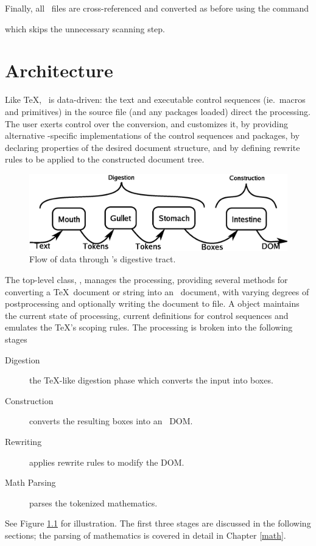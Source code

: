 \documentclass{report}
\begin{document}
Finally, all \XML\ files are cross-referenced and converted as before
using the command
\begin{quote}
\end{quote}
which skips the unnecessary scanning step.

\chapter{Architecture}\label{architecture}
Like \TeX, \LaTeXML\ is data-driven: the text and executable control
sequences (ie.~macros and primitives)
in the source file (and any packages loaded) direct the processing.
The user exerts control over the conversion, and customizes it, by 
providing alternative \LaTeXML-specific implementations of the control sequences and packages,
by declaring properties of the desired document structure,
and by defining rewrite rules to be applied to the constructed document tree.

\begin{figure}[tb]
\includegraphics[width=\columnwidth]{dataflow}
\caption{Flow of data through \LaTeXML's digestive tract.\label{fig:dataflow}}
\end{figure}
The top-level class, \ltxpkg{}, manages the processing, providing several methods
for converting a \TeX\ document or string into an \XML\ document, with varying degrees
of postprocessing and optionally writing the document to file.
A  object maintains the current state
of processing, current definitions for control sequences and emulates the
\TeX's scoping rules.
The processing is broken into the following stages
\begin{description}
 \item[Digestion] the \TeX-like digestion phase which converts the input into boxes.
 \item[Construction] converts the resulting boxes into an \XML\ DOM.
 \item[Rewriting] applies rewrite rules to modify the DOM.
 \item[Math Parsing] parses the tokenized mathematics.
\end{description}
See Figure \ref{fig:dataflow} for illustration.
The first three stages are discussed in the following sections;
the parsing of mathematics is covered in detail in Chapter \ref{math}.
\end{document}

